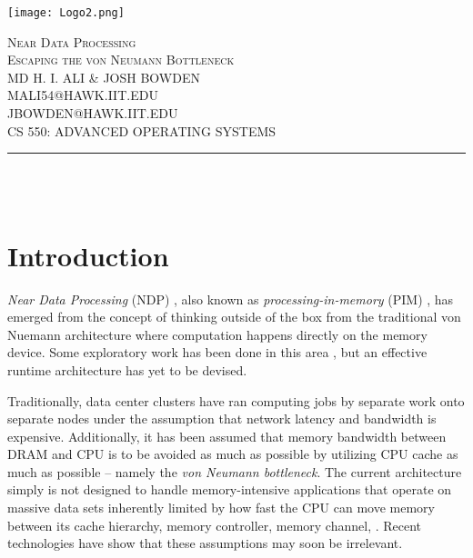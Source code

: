 \documentclass[12pt]{article}
\makeatletter
\let\thetitle\@title
\makeatother
\begin{document}

\begin{titlepage}
	\centering
    \vspace*{0.5 cm}
    \begin{center}
    \texttt{[image: Logo2.png]}\\[1.0 cm]	%
    \end{center}
    \textsc{\LARGE Near Data Processing }\\[0.5 cm]
    \textsc{\LARGE Escaping the von Neumann Bottleneck}\\[0.5 cm]
    \textsc{\lARGE MD H. I. ALI \& JOSH BOWDEN}\\[0.4 cm]
    \textsc{\lARGE MALI54@HAWK.IIT.EDU}\\[0.4 cm]
    \textsc{\lARGE JBOWDEN@HAWK.IIT.EDU}\\[0.4 cm]
	\textsc{CS 550: ADVANCED OPERATING SYSTEMS}\\[0.5 cm]%
	\rule{\linewidth}{0.2 mm} \\[0.4 cm]
	{ \huge \bfseries \thetitle}\\
	
 
	\vfill
	
\end{titlepage}


\pagebreak


\section{Introduction}

\emph{Near Data Processing} (NDP) \cite{Barbalace2017}, also known as \emph{processing-in-memory} (PIM) \cite{Boroumand2017, Ghose2019}, has emerged from the concept of thinking outside of the box from the traditional {von Nuemann} architecture where computation happens directly on the memory device. Some exploratory work has been done in this area \cite{Aguilera2018}, but an effective runtime architecture has yet to be devised.

Traditionally, data center clusters have ran computing jobs by separate work onto separate nodes under the assumption that network latency and bandwidth is expensive. Additionally, it has been assumed that memory bandwidth between DRAM and CPU is to be avoided as much as possible by utilizing CPU cache as much as possible -- namely the \emph{von Neumann bottleneck}. The current architecture simply is not designed to handle memory-intensive applications that operate on massive data sets inherently limited by how fast the CPU can move memory between its cache hierarchy, memory controller, memory channel, \cite{Aguilera2018}. Recent technologies have show that these assumptions may soon be irrelevant.
\end{document}
